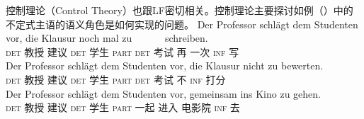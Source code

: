 控制理论（Control Theory）也跟LF密切相关。控制理论主要探讨如例（）中的不定式主语的语义角色是如何实现的问题。
\eal
\ex 
\gll Der Professor schlägt dem Studenten vor, die Klausur noch mal zu~~~~~~ schreiben.\\
	 \textsc{det} 教授 建议 \textsc{det} 学生 \textsc{part} \textsc{det} 考试 再 一次 \textsc{inf} 写\\
\ex 
\gll Der Professor schlägt dem Studenten vor, die Klausur nicht zu bewerten.\\
	 \textsc{det} 教授 建议 \textsc{det} 学生 \textsc{part} \textsc{det} 考试 不 \textsc{inf} 打分\\
\ex 
\gll Der Professor schlägt dem Studenten vor, gemeinsam ins Kino zu gehen.\hspace{-3pt}\\
	 \textsc{det} 教授 建议 \textsc{det} 学生 \textsc{part} 一起 进入 电影院 \textsc{inf} 去\\
\zl
{}


